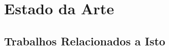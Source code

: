 \chapter{Estado da Arte}\label{cap:estArte}

\lipsum[34]

\section*{Trabalhos Relacionados a Isto}\label{sec:primTrab}

\lipsum[34-36]